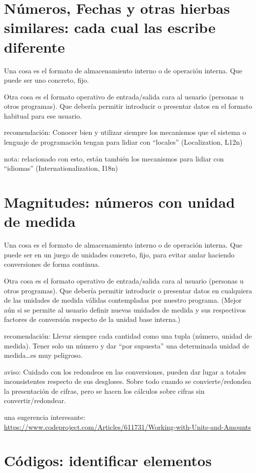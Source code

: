 \documentclass[spanish,12pt,a4paper,final,oneside]{book}
\begin{document}
\section{Números, Fechas y otras hierbas similares: cada cual las escribe diferente}

Una cosa es el formato de almacenamiento interno o de operación interna. Que puede ser uno concreto, fijo.

Otra cosa es el formato operativo de entrada/salida cara al usuario (personas u otros programas). Que debería permitir introducir o presentar datos en el formato habitual para ese usuario.

recomendación: Conocer bien y utilizar siempre los mecanismos que el sistema o lenguaje de programación tengan para lidiar con ``locales'' (Localization, L12n)

nota: relacionado con esto, están también los mecanismos para lidiar con ``idiomas''  (Internationalization, I18n)


\section{Magnitudes: números con unidad de medida}

Una cosa es el formato de almacenamiento interno o de operación interna. Que puede ser en un juego de unidades concreto, fijo, para evitar andar haciendo conversiones de forma continua.

Otra cosa es el formato operativo de entrada/salida cara al usuario (personas u otros programas). Que debería permitir introducir o presentar datos en cualquiera de las unidades de medida válidas contempladas por nuestro programa. (Mejor aún si se permite al usuario definir nuevas unidades de medida y sus respectivos factores de conversión respecto de la unidad base interna.)

recomendación: Llevar siempre cada cantidad como una tupla (número, unidad de medida). Tener solo un número y dar ``por supuesta'' una determinada unidad de medida\ldots es muy peligroso.

aviso: Cuidado con los redondeos en las conversiones, pueden dar lugar a totales inconsistentes respecto de sus desgloses. Sobre todo cuando se convierte/redondea la presentación de cifras, pero se hacen los cálculos sobre cifras sin convertir/redondear. 

una sugerencia interesante: \url{https://www.codeproject.com/Articles/611731/Working-with-Units-and-Amounts}


\section{Códigos: identificar elementos}
\end{document}

